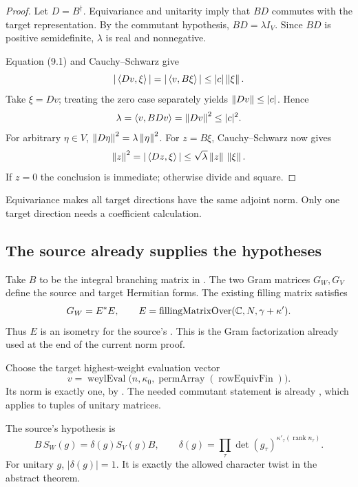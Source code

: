 \begin{proof}
Let \(D=B^\dagger\). Equivariance and unitarity imply that \(BD\)
commutes with the target representation. By the commutant hypothesis,
\(BD=\lambda I_V\). Since \(BD\) is positive semidefinite,
\(\lambda\) is real and nonnegative.

Equation (9.1) and Cauchy--Schwarz give
\[
 |\left\langle Dv,\xi\right\rangle|=|\left\langle v,B\xi\right\rangle|
 \le |c|\left\lVert\xi\right\rVert.
\]
Take \(\xi=Dv\); treating the zero case separately yields
\(\left\lVert Dv\right\rVert\le|c|\). Hence
\[
 \lambda=\left\langle v,BDv\right\rangle=\left\lVert Dv\right\rVert^2\le|c|^2.
\]
For arbitrary \(\eta\in V\),
\(\left\lVert D\eta\right\rVert^2=\lambda\left\lVert\eta\right\rVert^2\).
For \(z=B\xi\), Cauchy--Schwarz now gives
\[
 \left\lVert z\right\rVert^2=|\left\langle Dz,\xi\right\rangle|
       \le\sqrt{\lambda}\left\lVert z\right\rVert\,\left\lVert\xi\right\rVert.
\]
If \(z=0\) the conclusion is immediate; otherwise divide and square.
\end{proof}

Equivariance makes all target directions have the same adjoint norm.
Only one target direction needs a coefficient calculation.

\subsection{The source already supplies the hypotheses}

Take \(B\) to be the integral branching matrix in
.
The two Gram matrices \(G_W,G_V\) define the source and target Hermitian
forms. The existing filling matrix satisfies
\begin{equation}
 G_W=E^*E,
 \qquad E=\operatorname{fillingMatrixOver}(\mathbb C,N,\gamma+\kappa').
\end{equation}
Thus \(E\) is an isometry for the source's .
This is the Gram factorization already used at the end of the current
norm proof.

Choose the target highest-weight evaluation vector
\begin{equation}
 v=\operatorname{weylEval}
   \bigl(n,\kappa_0,\operatorname{permArray}(\operatorname{rowEquivFin})\bigr).
\end{equation}
Its norm is exactly one, by
.
The needed commutant statement is already
,
which applies to tuples of unitary matrices.

The source's hypothesis  is
\begin{equation}
 B\,S_W(g)=\delta(g)S_V(g)B,\qquad
 \delta(g)=\prod_\tau\det(g_\tau)^{\kappa'_\tau(\operatorname{rank}n_\tau)}.
\end{equation}
For unitary \(g\), \(|\delta(g)|=1\). It is exactly the allowed character
twist in the abstract theorem.

